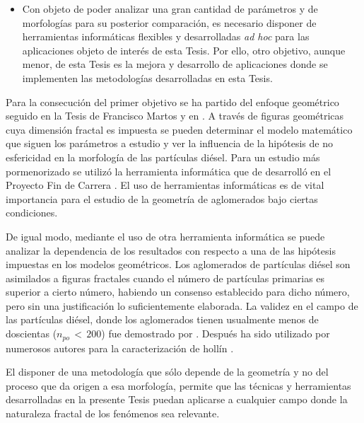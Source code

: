 \begin{itemize}
	\item Con objeto de poder analizar una gran cantidad de parámetros y de morfologías para su posterior comparación, es necesario disponer de herramientas informáticas flexibles y desarrolladas \textit{ad hoc} para las aplicaciones objeto de interés de esta Tesis. Por ello, otro objetivo, aunque menor, de esta Tesis es la mejora y desarrollo de aplicaciones donde se implementen las metodologías desarrolladas en esta Tesis.
	
\end{itemize}

\par Para la consecución del primer objetivo se ha partido del enfoque geométrico seguido en la Tesis de Francisco Martos \cite{martosphD:2006} y en \cite{lapuertaetal:2006,lapuertaetal:2010}. A través de figuras geométricas cuya dimensión fractal es impuesta se pueden determinar el modelo matemático que siguen los parámetros a estudio y ver la influencia de la hipótesis de no esfericidad en la morfología de las partículas diésel. Para un estudio más pormenorizado se utilizó la herramienta informática que de desarrolló en el Proyecto Fin de Carrera \cite{vieraPFC:2014}. El uso de herramientas informáticas es de vital importancia para el estudio de la geometría de aglomerados bajo ciertas condiciones.

\par De igual modo, mediante el uso de otra herramienta informática \cite{delblancoPFC:2015} se puede analizar la dependencia de los resultados con respecto a una de las hipótesis impuestas en los modelos geométricos. Los aglomerados de partículas diésel son asimilados a figuras fractales cuando el número de partículas primarias es superior a cierto número, habiendo un consenso establecido para dicho número, pero sin una justificación lo suficientemente elaborada. La validez en el campo de las partículas diésel, donde los aglomerados tienen usualmente menos de doscientas ($n_{po}\,<\,200$) fue demostrado por \cite{megaridisetal:1990}. Después ha sido utilizado por numerosos autores para la caracterización de hollín \cite{zhuetal:2003,leeetal:2002,caietal:1995,gorbunovetal:1999,zuritaetal:2002,parketal:2004}.

\par El disponer de una metodología que sólo depende de la geometría y no del proceso que da origen a esa morfología, permite que las técnicas y herramientas desarrolladas en la presente Tesis puedan aplicarse a cualquier campo donde la naturaleza fractal de los fenómenos sea relevante.

